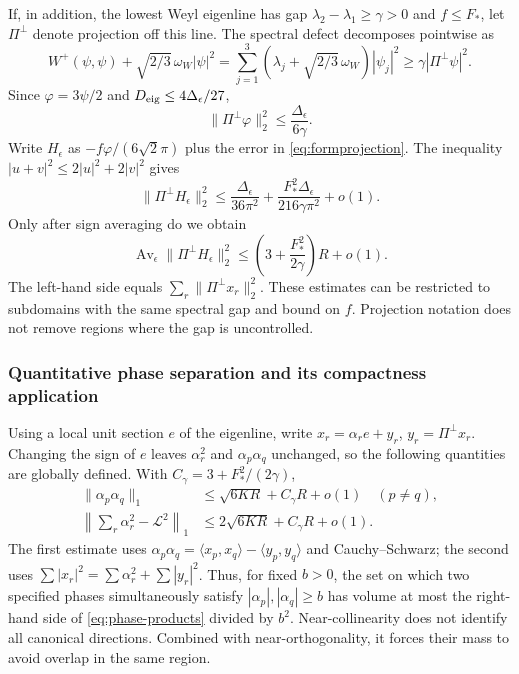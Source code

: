 \documentclass[a4paper,11pt]{article}
\numberwithin{equation}{section}
\theoremstyle{definition}
\begin{document}
If, in addition, the lowest Weyl eigenline has gap $\lambda_2-\lambda_1\ge\gamma>0$
and $f\le F_*$, let $\Pi^\perp$ denote projection off this line. The spectral defect decomposes pointwise as
\begin{equation}\label{eq:eigenline-deficit}
W^+(\psi,\psi)+\sqrt{2/3}\,\omega_W|\psi|^2
=\sum_{j=1}^3(\lambda_j+\sqrt{2/3}\,\omega_W)|\psi_j|^2
\ge\gamma|\Pi^\perp\psi|^2.
\end{equation}
Since $\varphi=3\psi/2$ and $D_{\rm eig}\le4\Delta_\epsilon/27$,
\[
\|\Pi^\perp\varphi\|_2^2\le\frac{\Delta_\epsilon}{6\gamma}.
\]
Write $H_\epsilon$ as $-f\varphi/(6\sqrt2\pi)$ plus the error in
\eqref{eq:formprojection}. The inequality $|u+v|^2\le2|u|^2+2|v|^2$ gives
\[
\|\Pi^\perp H_\epsilon\|_2^2
\le\frac{\Delta_\epsilon}{36\pi^2}
 +\frac{F_*^2\Delta_\epsilon}{216\gamma\pi^2}+o(1).
\]
Only after sign averaging do we obtain
\[
\operatorname{Av}_\epsilon\|\Pi^\perp H_\epsilon\|_2^2
\le\left(3+\frac{F_*^2}{2\gamma}\right)R+o(1).
\]
The left-hand side equals $\sum_r\|\Pi^\perp x_r\|_2^2$.
These estimates can be restricted to subdomains with the same spectral gap and bound on $f$.
Projection notation does not remove regions where the gap is uncontrolled.

\subsubsection{Quantitative phase separation and its compactness application}\label{sec:walsh-phases}
Using a local unit section $e$ of the eigenline, write $x_r=\alpha_re+y_r$,
$y_r=\Pi^\perp x_r$. Changing the sign of $e$ leaves $\alpha_r^2$ and
$\alpha_p\alpha_q$ unchanged, so the following quantities are globally defined. With
$C_\gamma=3+F_*^2/(2\gamma)$,
\begin{align}
\|\alpha_p\alpha_q\|_1
&\le\sqrt{6KR}+C_\gamma R+o(1)\quad(p\ne q),\label{eq:phase-products}\\
\left\|\sum_r\alpha_r^2-\mathcal L^2\right\|_1
&\le2\sqrt{6KR}+C_\gamma R+o(1).\label{eq:phase-mass}
\end{align}
The first estimate uses
$\alpha_p\alpha_q=\langle x_p,x_q\rangle-\langle y_p,y_q\rangle$
and Cauchy--Schwarz; the second uses
$\sum|x_r|^2=\sum\alpha_r^2+\sum|y_r|^2$.
Thus, for fixed $b>0$, the set on which two specified phases simultaneously satisfy $|\alpha_p|,|\alpha_q|\ge b$
has volume at most the right-hand side of \eqref{eq:phase-products} divided by $b^2$.
Near-collinearity does not identify all canonical directions. Combined with near-orthogonality, it forces their mass to avoid overlap in the same region.
\end{document}
